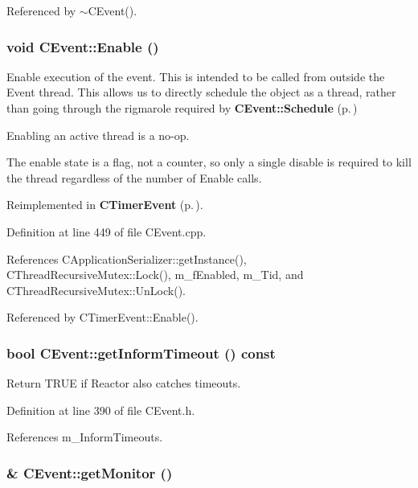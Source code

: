 Referenced by $\sim$CEvent().
\subsubsection{\setlength{\rightskip}{0pt plus 5cm}void CEvent::Enable ()}\label{classCEvent_a11}


Enable execution of the event. This is intended to be called from outside the Event thread. This allows us to directly schedule the object as a thread, rather than going through the rigmarole required by {\bf CEvent::Schedule} {\rm (p.\,\pageref{classCEvent_b3})}

\begin{CompactItemize}
\item 
Enabling an active thread is a no-op.\item 
The enable state is a flag, not a counter, so only a single disable is required to kill the thread regardless of the number of Enable calls. \end{CompactItemize}


Reimplemented in {\bf CTimer\-Event} {\rm (p.\,\pageref{classCTimerEvent_a7})}.

Definition at line 449 of file CEvent.cpp.

References CApplication\-Serializer::get\-Instance(), CThread\-Recursive\-Mutex::Lock(), m\_\-f\-Enabled, m\_\-Tid, and CThread\-Recursive\-Mutex::Un\-Lock().

Referenced by CTimer\-Event::Enable().
\subsubsection{\setlength{\rightskip}{0pt plus 5cm}bool CEvent::get\-Inform\-Timeout () const\hspace{0.3cm}{\tt  [inline]}}\label{classCEvent_a6}


Return TRUE if Reactor also catches timeouts.



Definition at line 390 of file CEvent.h.

References m\_\-Inform\-Timeouts.
\subsubsection{\& CEvent::get\-Monitor ()\hspace{0.3cm}{\tt  [inline]}}\label{classCEvent_a8}


